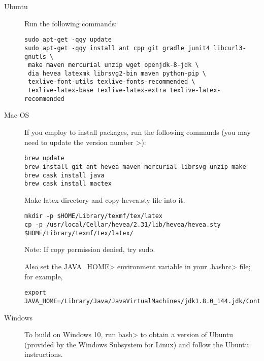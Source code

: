 \begin{description}
\item[Ubuntu]
  Run the following commands:

\begin{Verbatim}
sudo apt-get -qqy update
sudo apt-get -qqy install ant cpp git gradle junit4 libcurl3-gnutls \
 make maven mercurial unzip wget openjdk-8-jdk \
 dia hevea latexmk librsvg2-bin maven python-pip \
 texlive-font-utils texlive-fonts-recommended \
 texlive-latex-base texlive-latex-extra texlive-latex-recommended

\end{Verbatim}


\item[Mac OS]
  If you employ  to install packages, run
  the following commands (you may need to update the version number >):

\begin{Verbatim}
brew update
brew install git ant hevea maven mercurial librsvg unzip make
brew cask install java
brew cask install mactex
\end{Verbatim}

Make latex directory and copy hevea.sty file into it.

\begin{Verbatim}
mkdir -p $HOME/Library/texmf/tex/latex
cp -p /usr/local/Cellar/hevea/2.31/lib/hevea/hevea.sty $HOME/Library/texmf/tex/latex/
\end{Verbatim}

Note: If copy permission denied, try sudo.

Also set the \<JAVA\_HOME> environment variable in your \<.bashrc> file;
for example,

\begin{Verbatim}
export JAVA_HOME=/Library/Java/JavaVirtualMachines/jdk1.8.0_144.jdk/Contents/Home
\end{Verbatim}


\item[Windows]
  To build on Windows 10,
  run \<bash> to obtain a version of
  Ubuntu (provided by the Windows Subsystem for Linux) and follow the Ubuntu
  instructions.


\end{description}


